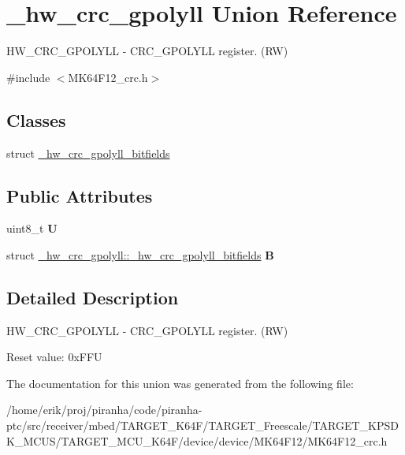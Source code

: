 \hypertarget{union__hw__crc__gpolyll}{}\section{\+\_\+hw\+\_\+crc\+\_\+gpolyll Union Reference}
\label{union__hw__crc__gpolyll}


H\+W\+\_\+\+C\+R\+C\+\_\+\+G\+P\+O\+L\+Y\+LL -\/ C\+R\+C\+\_\+\+G\+P\+O\+L\+Y\+LL register. (RW)  




{\ttfamily \#include $<$M\+K64\+F12\+\_\+crc.\+h$>$}

\subsection*{Classes}
\begin{DoxyCompactItemize}
\item 
struct \hyperlink{struct__hw__crc__gpolyll_1_1__hw__crc__gpolyll__bitfields}{\+\_\+hw\+\_\+crc\+\_\+gpolyll\+\_\+bitfields}
\end{DoxyCompactItemize}
\subsection*{Public Attributes}
\begin{DoxyCompactItemize}
\item 
uint8\+\_\+t {\bfseries U}\hypertarget{union__hw__crc__gpolyll_a7e89a39937dbd1db657255ec0fc87c72}{}\label{union__hw__crc__gpolyll_a7e89a39937dbd1db657255ec0fc87c72}

\item 
struct \hyperlink{struct__hw__crc__gpolyll_1_1__hw__crc__gpolyll__bitfields}{\+\_\+hw\+\_\+crc\+\_\+gpolyll\+::\+\_\+hw\+\_\+crc\+\_\+gpolyll\+\_\+bitfields} {\bfseries B}\hypertarget{union__hw__crc__gpolyll_afe861b7f5a68efd2a822ba406acfa722}{}\label{union__hw__crc__gpolyll_afe861b7f5a68efd2a822ba406acfa722}

\end{DoxyCompactItemize}


\subsection{Detailed Description}
H\+W\+\_\+\+C\+R\+C\+\_\+\+G\+P\+O\+L\+Y\+LL -\/ C\+R\+C\+\_\+\+G\+P\+O\+L\+Y\+LL register. (RW) 

Reset value\+: 0x\+F\+FU 

The documentation for this union was generated from the following file\+:\begin{DoxyCompactItemize}
\item 
/home/erik/proj/piranha/code/piranha-\/ptc/src/receiver/mbed/\+T\+A\+R\+G\+E\+T\+\_\+\+K64\+F/\+T\+A\+R\+G\+E\+T\+\_\+\+Freescale/\+T\+A\+R\+G\+E\+T\+\_\+\+K\+P\+S\+D\+K\+\_\+\+M\+C\+U\+S/\+T\+A\+R\+G\+E\+T\+\_\+\+M\+C\+U\+\_\+\+K64\+F/device/device/\+M\+K64\+F12/M\+K64\+F12\+\_\+crc.\+h\end{DoxyCompactItemize}
